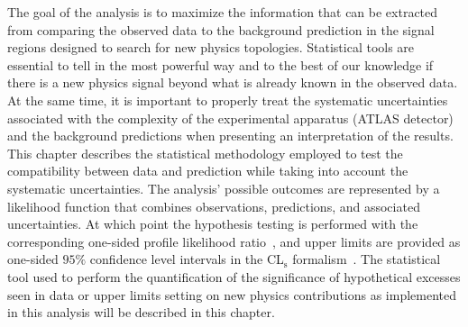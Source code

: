 The goal of the analysis is to maximize the information that can be 
extracted from comparing the observed data to the background 
prediction in the signal regions designed to search for new physics 
topologies. Statistical tools are essential to tell in the most 
powerful way and to the best of our knowledge if there is a new physics 
signal beyond what is already known in the observed data. 
At the same time, it is important to properly treat the systematic 
uncertainties associated with the complexity of the experimental 
apparatus (ATLAS detector) and the background predictions when 
presenting an interpretation of the results. 
This chapter describes the statistical methodology employed to 
test the compatibility between data and prediction while taking into 
account the systematic uncertainties. 
The analysis' possible outcomes are represented by a likelihood function 
that combines observations, predictions, and associated uncertainties. 
At which point the 
hypothesis testing is performed with the corresponding one-sided profile 
likelihood ratio~\cite{Cowan:2010js}, 
and upper limits are provided as one-sided $95\%$ confidence level intervals in the CL$_\text{s}$ formalism~\cite{Read:2002}. 
The statistical tool used to perform the quantification of the significance 
of hypothetical excesses seen in data
or upper limits setting on new physics contributions as implemented in 
this analysis will be described in this chapter.


